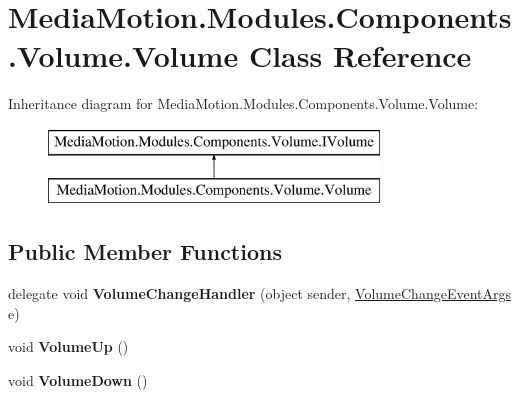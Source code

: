 \hypertarget{class_media_motion_1_1_modules_1_1_components_1_1_volume_1_1_volume}{\section{Media\+Motion.\+Modules.\+Components.\+Volume.\+Volume Class Reference}
\label{class_media_motion_1_1_modules_1_1_components_1_1_volume_1_1_volume}
}
Inheritance diagram for Media\+Motion.\+Modules.\+Components.\+Volume.\+Volume\+:\begin{figure}[H]
\begin{center}
\leavevmode
\includegraphics[height=2.000000cm]{class_media_motion_1_1_modules_1_1_components_1_1_volume_1_1_volume}
\end{center}
\end{figure}
\subsection*{Public Member Functions}
\begin{DoxyCompactItemize}
\item 
\hypertarget{class_media_motion_1_1_modules_1_1_components_1_1_volume_1_1_volume_aa139af6299f07c6cd565463ddd656aef}{delegate void {\bfseries Volume\+Change\+Handler} (object sender, \hyperlink{class_media_motion_1_1_modules_1_1_components_1_1_volume_1_1_events_1_1_volume_change_event_args}{Volume\+Change\+Event\+Args} e)}\label{class_media_motion_1_1_modules_1_1_components_1_1_volume_1_1_volume_aa139af6299f07c6cd565463ddd656aef}

\item 
\hypertarget{class_media_motion_1_1_modules_1_1_components_1_1_volume_1_1_volume_a78ee24429301cb6f0dbed70e61401951}{void {\bfseries Volume\+Up} ()}\label{class_media_motion_1_1_modules_1_1_components_1_1_volume_1_1_volume_a78ee24429301cb6f0dbed70e61401951}

\item 
\hypertarget{class_media_motion_1_1_modules_1_1_components_1_1_volume_1_1_volume_af1d1a2f2cec6adda05edbb5411a96628}{void {\bfseries Volume\+Down} ()}\label{class_media_motion_1_1_modules_1_1_components_1_1_volume_1_1_volume_af1d1a2f2cec6adda05edbb5411a96628}

\end{DoxyCompactItemize}

